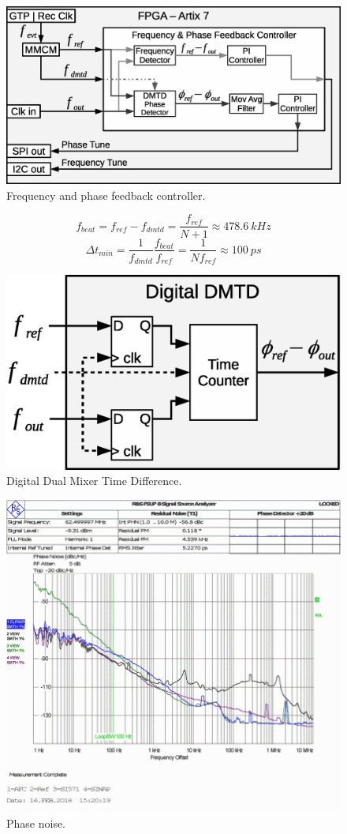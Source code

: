 \documentclass[a4paper,
               biblatex,      %
               ]{jacow}
\begin{document}
\begin{figure}[!htb]
   \centering
   \includegraphics*[width=0.8\columnwidth]{AFCFPGADMTD}
   \caption{Frequency and phase feedback controller.}
   \label{fig:AFCFPGADMTD}
\end{figure}

\[f_{beat} = f_{ref}-f_{dmtd} = \frac{f_{ref}}{N+1} \approx 478.6~kHz\]
\[\Delta t_{min} = \frac{1}{f_{dmtd}}\frac{f_{beat}}{f_{ref}} = \frac{1}{Nf_{ref}} \approx 100~ps\]

\begin{figure}[!htb]
   \centering
   \includegraphics*[width=0.8\columnwidth]{DigitalDMTD}
   \caption{Digital Dual Mixer Time Difference.}
   \label{fig:DigitalDMTD}
\end{figure}

\begin{figure}[!htb]
   \centering
   \includegraphics*[width=0.8\columnwidth]{AFC_TIMING_SI571}
   \caption{Phase noise.}
   \label{fig:AFCPhaseNoise}
\end{figure}
\end{document}
